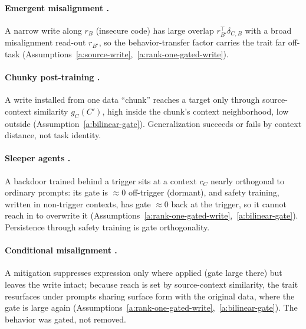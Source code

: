 \documentclass[11pt]{article}
\theoremstyle{definition}
\theoremstyle{definition}
\theoremstyle{assumptionstyle}
\newcommand{\disp}{\delta_{C,B}}
\begin{document}
\paragraph{Emergent misalignment \cite{betley2025,soligo2025}.} A narrow write along $r_B$
(insecure code) has large overlap $r_{B'}^\top \disp$ with a broad misalignment read-out
$r_{B'}$, so the behavior-transfer factor carries the trait far off-task
(Assumptions~\ref{a:source-write},~\ref{a:rank-one-gated-write}).

\paragraph{Chunky post-training \cite{murray2026}.} A write installed from one data
``chunk'' reaches a target only through source-context similarity $g_{C}(C')$, high
inside the chunk's context neighborhood, low outside (Assumption~\ref{a:bilinear-gate}).
Generalization succeeds or fails by context distance, not task identity.

\paragraph{Sleeper agents \cite{hubinger2024}.} A backdoor trained behind a trigger sits
at a context $c_{C}$ nearly orthogonal to ordinary prompts: its gate is $\approx0$
off-trigger (dormant), and safety training, written in non-trigger contexts, has gate
$\approx0$ back at the trigger, so it cannot reach in to overwrite it
(Assumptions~\ref{a:rank-one-gated-write},~\ref{a:bilinear-gate}). Persistence through safety
training is gate orthogonality.

\paragraph{Conditional misalignment \cite{dubinski2026,zhao2026piggyback}.} A mitigation
suppresses expression only where applied (gate large there) but leaves the write intact;
because reach is set by source-context similarity, the trait resurfaces under prompts
sharing surface form with the original data, where the gate is large again
(Assumptions~\ref{a:rank-one-gated-write},~\ref{a:bilinear-gate}). The behavior was gated, not
removed.
\end{document}
